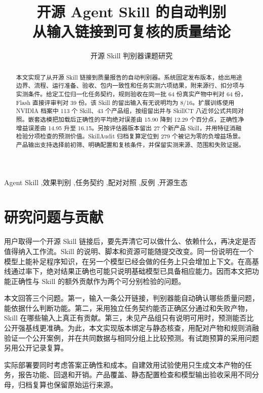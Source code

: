 \documentclass[final,5p,twocolumn,10pt]{elsarticle}
\begin{document}
\begin{frontmatter}
\title{开源 Agent Skill 的自动判别\\从输入链接到可复核的质量结论}
\author{开源 Skill 判别器课题研究}

\begin{abstract}
本文实现了从开源 Skill 链接到质量报告的自动判别器。系统固定发布版本，给出用途边界、流程、运行准备、验收、包内一致性和任务实测六项结果，附来源行、扣分项与实测条件。给定工位归一化任务契约，规则验收在同一批 64 份真实产物中判对 64 份，Flash 直接评审判对 39 份。该 Skill 的留出输入有无说明均为 8/16。扩展训练使用 NVIDIA 档案中 113 个 Skill、43 个产品组，按组留出并与 SkillCT 八近邻公式共同对照。嵌套选模把加载后正确性的平均绝对误差由 15.90 降到 12.29 个百分点，正确性净增益误差由 14.95 升至 16.15。另按评估器版本留出 27 个新产品 Skill，并用特征消融检验分项检查的预测价值。SkillAudit 归档复算定位到 279 个被记为零的负增益场景。产品输出支持选择前初筛、明确配置和复核条件，并保留实测来源、范围和失败证据。
\end{abstract}
\begin{keyword}
Agent Skill \sep 效果判别 \sep 任务契约 \sep 配对对照 \sep 反例 \sep 开源生态
\end{keyword}
\end{frontmatter}

\section{研究问题与贡献}

用户取得一个开源 Skill 链接后，要先弄清它可以做什么、依赖什么，再决定是否值得纳入工作流。Skill 的说明、脚本和资源可能随提交改变。同一份说明在一个模型上能补足程序知识，在另一个模型已经会做的任务上只会增加上下文。在高基线通过率下，绝对结果正确也可能只说明基础模型已具备相应能力。因而本文把功能正确性与 Skill 的额外贡献作为两个可分别检验的问题。

本文回答三个问题。第一，输入一条公开链接，判别器能自动确认哪些质量问题，能依据什么判断功能。第二，采用独立任务契约能否正确区分通过和失败产物，Skill 在哪些输入上真正有贡献。第三，未见产品组只有说明可用时，预测能否比公开强基线更准确。为此，本文实现版本绑定与静态核查，用配对产物和规则消融验证一个公开案例，并在共同数据与相同分组上比较预测。有试跑预算的采用问题另用公开记录复算。

实际部署要同时考虑答案正确性和成本。自建效用试验使用只生成文本产物的任务，报告功能、回退和开销。产品覆盖、静态配置检查和模型输出验收采用不同分母，归档复算也保留原始运行来源。
\end{document}
